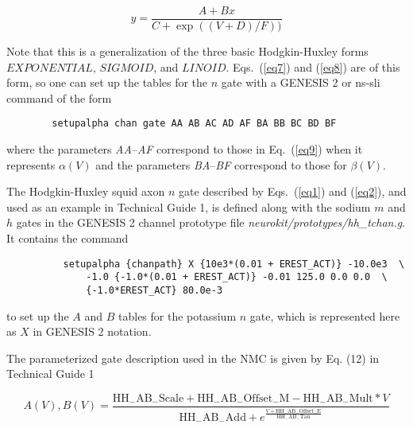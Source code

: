 \documentclass[12pt]{article}
\begin{document}
\begin{equation}
y = \frac{A + B x}{C + \exp((V + D) / F))}
\label{eq9}
\end{equation}

Note that this is a generalization of the three basic Hodgkin-Huxley forms
$EXPONENTIAL$, $SIGMOID$, and $LINOID$.  Eqs.~(\ref{eq7}) and (\ref{eq8})
are of this form, so one can set up the tables for the $n$ gate with a
GENESIS 2 or ns-sli command of the form

\begin{verbatim}
        setupalpha chan gate AA AB AC AD AF BA BB BC BD BF
\end{verbatim}

where the parameters {\em AA\/}--{\em AF\/} correspond to those in
Eq.~(\ref{eq9}) when it represents $\alpha(V)$ and the parameters {\em
BA\/}--{\em BF\/} correspond to those for $\beta(V)$.  

The Hodgkin-Huxley squid axon $n$ gate described by Eqs.~(\ref{eq1}) and
(\ref{eq2}), and used as an example in Technical Guide 1, is defined along
with the sodium $m$ and $h$ gates in the GENESIS 2 channel prototype file
{\em neurokit/prototypes/hh\_tchan.g}.  It contains the command

\begin{verbatim}
          setupalpha {chanpath} X {10e3*(0.01 + EREST_ACT)} -10.0e3  \
              -1.0 {-1.0*(0.01 + EREST_ACT)} -0.01 125.0 0.0 0.0  \
              {-1.0*EREST_ACT} 80.0e-3
\end{verbatim}

to set up the $A$ and $B$ tables for the potassium $n$ gate, which is
represented here as $X$ in GENESIS 2 notation.

The parameterized gate description used in the NMC is given by Eq. (12) in
Technical Guide 1


\begin{equation}
  \label{eq10}
  A(V), B(V) =  \frac{ 
 \mathrm{HH_{-}AB_{-}Scale} + \mathrm{HH_{-}AB_{-}Offset_{-}M} -
 \mathrm{HH_{-}AB_{-}Mult} *  V }{ \mathrm{HH_{-}AB_{-}Add} +
  e ^ {\frac { V + 
  \mathrm{HH_{-}AB_{-}Offset_{-}E} }{ \mathrm{HH_{-}AB_{-}Tau}}}}
\end{equation}
\end{document}
